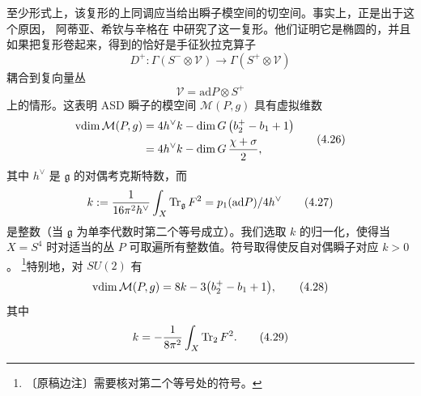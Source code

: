 至少形式上，该复形的上同调应当给出瞬子模空间的切空间。事实上，正是出于这个原因，
阿蒂亚、希钦与辛格在 \cite{ref1} 中研究了这一复形。他们证明它是椭圆的，并且
如果把复形卷起来，得到的恰好是手征狄拉克算子
\begin{equation}
  D^{+}:\Gamma(S^{-}\otimes\mathcal{V})\to\Gamma(S^{+}\otimes\mathcal{V})
  \tag{4.24}
\end{equation}
耦合到复向量丛
\begin{equation}
  \mathcal{V}=\mathrm{ad}P\otimes S^{+}
  \tag{4.25}
\end{equation}
上的情形。这表明 ASD 瞬子的模空间 $\mathcal{M}(P,g)$ 具有虚拟维数
\begin{equation}
  \begin{aligned}
    \operatorname{vdim}\mathcal{M}(P,g)
      &=4h^{\vee}k-\dim G\,\bigl(b_{2}^{+}-b_{1}+1\bigr)\\
      &=4h^{\vee}k-\dim G\,\frac{\chi+\sigma}{2},
  \end{aligned}
  \tag{4.26}
\end{equation}
其中 $h^{\vee}$ 是 $\mathfrak{g}$ 的对偶考克斯特数，而
\begin{equation}
  k:=\frac{1}{16\pi^{2}h^{\vee}}\int_{X}\operatorname{Tr}_{\mathfrak{g}}F^{2}
  =p_{1}(\mathrm{ad}P)/4h^{\vee}
  \tag{4.27}
\end{equation}
是整数（当 $\mathfrak{g}$ 为单李代数时第二个等号成立）。我们选取 $k$ 的归一化，使得当
$X=S^{4}$ 时对适当的丛 $P$ 可取遍所有整数值。符号取得使反自对偶瞬子对应 $k>0$。
\footnote{〔原稿边注〕需要核对第二个等号处的符号。}特别地，对 $SU(2)$ 有
\begin{equation}
  \operatorname{vdim}\mathcal{M}(P,g)=8k-3\bigl(b_{2}^{+}-b_{1}+1\bigr),
  \tag{4.28}
\end{equation}
其中
\begin{equation}
  k=-\frac{1}{8\pi^{2}}\int_{X}\operatorname{Tr}_{2}F^{2}.
  \tag{4.29}
\end{equation}



